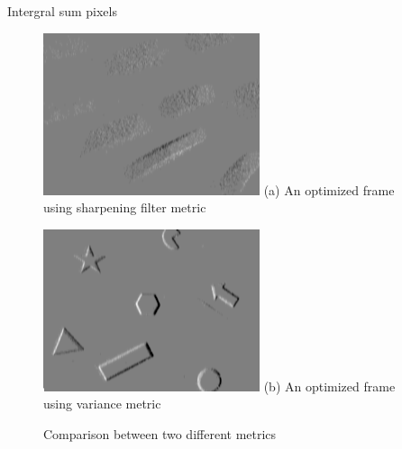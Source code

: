 Intergral sum pixels

\begin{figure}
  \begin{minipage}[t]{0.48\textwidth}
    \centering \includegraphics[width =
    \textwidth]{images/high_pass_contrast.png}
    (a) An optimized frame using sharpening filter metric
  \end{minipage}
  \hfill
  \begin{minipage}[t]{0.48\textwidth}
    \centering \includegraphics[width =
    \textwidth]{images/variance_contrast.png}
    (b) An optimized frame using variance metric
  \end{minipage}
  \caption{Comparison between two different metrics}
  \label{fig:contrast}
\end{figure}



